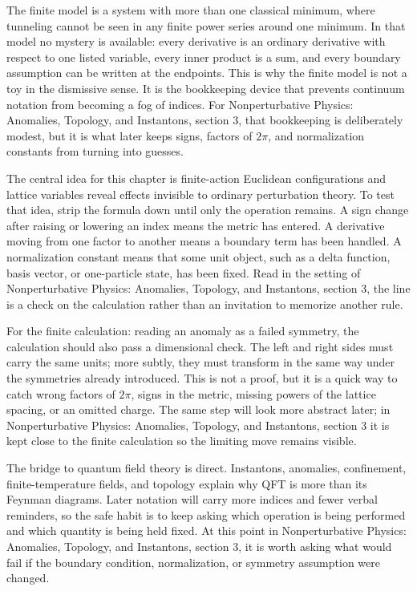The finite model is a system with more than one classical minimum, where tunneling cannot be seen in any finite power series around one minimum.  In that model no mystery is available: every derivative is an ordinary derivative with respect to one listed variable, every inner product is a sum, and every boundary assumption can be written at the endpoints.  This is why the finite model is not a toy in the dismissive sense.  It is the bookkeeping device that prevents continuum notation from becoming a fog of indices.  For Nonperturbative Physics: Anomalies, Topology, and Instantons, section 3, that bookkeeping is deliberately modest, but it is what later keeps signs, factors of \(2\pi\), and normalization constants from turning into guesses.

The central idea for this chapter is finite-action Euclidean configurations and lattice variables reveal effects invisible to ordinary perturbation theory.  To test that idea, strip the formula down until only the operation remains.  A sign change after raising or lowering an index means the metric has entered.  A derivative moving from one factor to another means a boundary term has been handled.  A normalization constant means that some unit object, such as a delta function, basis vector, or one-particle state, has been fixed.  Read in the setting of Nonperturbative Physics: Anomalies, Topology, and Instantons, section 3, the line is a check on the calculation rather than an invitation to memorize another rule.

For the finite calculation: reading an anomaly as a failed symmetry, the calculation should also pass a dimensional check.  The left and right sides must carry the same units; more subtly, they must transform in the same way under the symmetries already introduced.  This is not a proof, but it is a quick way to catch wrong factors of \(2\pi\), signs in the metric, missing powers of the lattice spacing, or an omitted charge.  The same step will look more abstract later; in Nonperturbative Physics: Anomalies, Topology, and Instantons, section 3 it is kept close to the finite calculation so the limiting move remains visible.

The bridge to quantum field theory is direct.  Instantons, anomalies, confinement, finite-temperature fields, and topology explain why QFT is more than its Feynman diagrams.  Later notation will carry more indices and fewer verbal reminders, so the safe habit is to keep asking which operation is being performed and which quantity is being held fixed.  At this point in Nonperturbative Physics: Anomalies, Topology, and Instantons, section 3, it is worth asking what would fail if the boundary condition, normalization, or symmetry assumption were changed.

